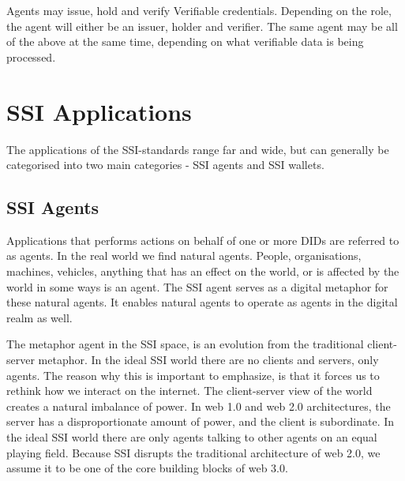 Agents may issue, hold and verify Verifiable credentials. Depending on
the role, the agent will either be an issuer, holder and verifier. The same agent may
be all of the above at the same time, depending on what verifiable data
is being processed.





\hypertarget{ssi-applications}{%
\section{SSI Applications}\label{ssi-applications}}

The applications of the SSI-standards range far and wide, but can
generally be categorised into two main categories - SSI agents and SSI
wallets.

\hypertarget{ssi-agents}{%
\subsection{SSI Agents}\label{ssi-agents}}

Applications that performs actions on behalf of one or more DIDs are
referred to as agents. In the real world we find natural agents. People,
organisations, machines, vehicles, anything that has an effect on the
world, or is affected by the world in some ways is an agent. The SSI
agent serves as a digital metaphor for these natural agents. It enables
natural agents to operate as agents in the digital realm as well.

The metaphor agent in the SSI space, is an evolution from the
traditional client-server metaphor. In the ideal SSI world there are no
clients and servers, only agents. The reason why this is important to
emphasize, is that it forces us to rethink how we interact on the internet.
The client-server view of the world creates a natural imbalance of
power. In web 1.0 and web 2.0 architectures, the server has a
disproportionate amount of power, and the client is subordinate. In the ideal SSI world there are only agents talking to other agents on an equal playing field. Because SSI disrupts the traditional architecture of web 2.0, we assume it to be one of the core building blocks of web 3.0.



\pagebreak



